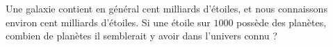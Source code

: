 
\begin{exercice}\label{exo2smath-0206}

    Une galaxie contient en général cent milliards d'étoiles, et nous connaissons environ cent milliards d'étoiles. Si une étoile sur \( 1000\) possède des planètes, combien de planètes il semblerait y avoir dans l'univers connu ?

\end{exercice}
